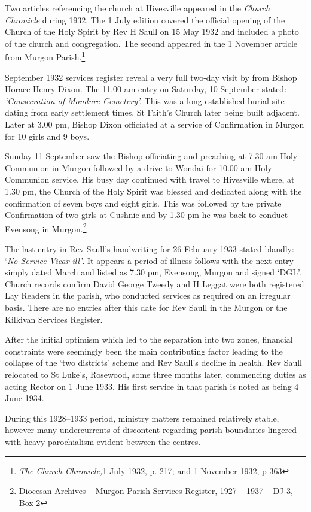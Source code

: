 Two articles referencing the church at Hivesville appeared in the \emph{Church Chronicle} during 1932. The 1 July edition covered the official opening of the Church of the Holy Spirit by Rev H Saull on 15 May 1932 and included a photo of the church and congregation. The second appeared in the 1 November article from Murgon Parish.\footnote{\emph{The Church Chronicle,}1 July 1932, p. 217; and 1 November 1932, p 363}

September 1932 services register reveal a very full two-day visit by from Bishop Horace Henry Dixon. The 11.00 am entry on Saturday, 10 September stated: \emph{`Consecration of Mondure Cemetery'.} This was a long-established burial site dating from early settlement times, St Faith's Church later being built adjacent. Later at 3.00 pm, Bishop Dixon officiated at a service of Confirmation in Murgon for 10 girls and 9 boys.

Sunday 11 September saw the Bishop officiating and preaching at 7.30 am Holy Communion in Murgon followed by a drive to Wondai for 10.00 am Holy Communion service. His busy day continued with travel to Hivesville where, at 1.30 pm, the Church of the Holy Spirit was blessed and dedicated along with the confirmation of seven boys and eight girls. This was followed by the private Confirmation of two girls at Cushnie and by 1.30 pm he was back to conduct Evensong in Murgon.\footnote{Diocesan Archives -- Murgon Parish Services Register, 1927 -- 1937 -- DJ 3, Box 2}

The last entry in Rev Saull's handwriting for 26 February 1933 stated blandly: `\emph{No Service Vicar ill'}. It appears a period of illness follows with the next entry simply dated March and listed as 7.30 pm, Evensong, Murgon and signed `DGL'. Church records confirm David George Tweedy and H Leggat were both registered Lay Readers in the parish, who conducted services as required on an irregular basis. There are no entries after this date for Rev Saull in the Murgon or the Kilkivan Services Register.

After the initial optimism which led to the separation into two zones, financial constraints were seemingly been the main contributing factor leading to the collapse of the `two districts' scheme and Rev Saull's decline in health. Rev Saull relocated to St Luke's, Rosewood, some three months later, commencing duties as acting Rector on 1 June 1933. His first service in that parish is noted as being 4 June 1934.

During this 1928--1933 period, ministry matters remained relatively stable, however many undercurrents of discontent regarding parish boundaries lingered with heavy parochialism evident between the centres.

